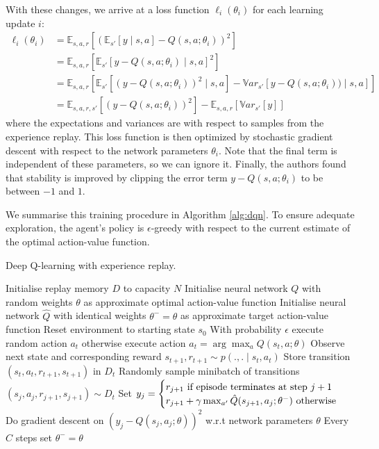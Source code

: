 \documentclass[11pt, a4paper, bibliography=totoc]{report}
\newcommand{\E}[2]{\mathbb{E}_{#1} \left[ #2 \right] }
\newcommand{\V}[2]{\mathbb{V}ar_{#1} \left[ #2 \right]}
\begin{document}
With these changes, we arrive at a loss function $ \ell_i(\theta_i) $ for each learning update $ i $:
\begin{align*}
\ell_i(\theta_i) &= \E{ s,a,r }{ (\E{s'}{y \mid s,a} - Q(s,a;\theta_i))^2 } \\
                 &= \E{ s,a,r }{ \E{s'}{y - Q(s,a;\theta_i) \mid s,a } ^2 } \\
                 &= \E{ s,a,r }{ \E{s'}{(y - Q(s,a;\theta_i))^2 \mid s,a}  - \V{s'}{y - Q(s,a;\theta_i)) \mid s,a}   } \\
                 &= \E{s,a,r,s'}{(y - Q(s,a;\theta_i))^2} - \E{s,a,r}{\V{s'}{y}}
\end{align*}
where the expectations and variances are with respect to samples from the experience replay. This loss function is then optimized by stochastic gradient descent with respect to the network parameters $ \theta_i $. Note that the final term is independent of these parameters, so we can ignore it. Finally, the authors found that stability is improved by clipping the error term $ y - Q(s,a;\theta_i) $ to be between $ -1 $ and $ 1 $.

We summarise this training procedure in Algorithm \ref{alg:dqn}. To ensure adequate exploration, the agent's policy is $ \epsilon $-greedy with respect to the current estimate of the optimal action-value function.

\begin{algorithm}
	\caption{Deep Q-learning with experience replay.}
	\label{alg:dqn}
	\begin{algorithmic}[1]
		\State Initialise replay memory $ D $ to capacity $ N $
		\State Initialise neural network $ Q $ with random weights $ \theta $ as approximate optimal action-value function
		\State Initialise neural network $ \hat{Q} $ with identical weights $ \theta^- = \theta $ as approximate target action-value function
		\State Reset environment to starting state $ s_0 $
		\State With probability $ \epsilon $ execute random action $ a_t $
		\State otherwise execute action $ a_t = \arg\max_a Q(s_t, a ; \theta) $
		\State Observe next state and corresponding reward $ s_{t+1}, r_{t+1} \sim p(.,.\mid s_t,a_t) $
		\State Store transition $ (s_t, a_t, r_{t+1}, s_{t+1}) $ in $ D_t $
		\State Randomly sample minibatch of transitions $ (s_j, a_j, r_{j+1}, s_{j+1}) \sim D_t $
		\State Set $ y_j = \begin{cases}
		                   r_{j+1} \text{ if episode terminates at step $ j+1 $} \\
		                   r_{j+1} + \gamma \max_{a'} \hat{Q}(s_{j+1}, a_j ; \theta^- ) \text{ otherwise}
		\end{cases}$
		\State Do gradient descent on $ (y_j - Q(s_j, a_j ; \theta))^2 $ w.r.t network parameters $ \theta $
		\State Every $ C $ steps set $ \theta^- = \theta $
		\EndFor
	\end{algorithmic}
\end{algorithm}
\end{document}

